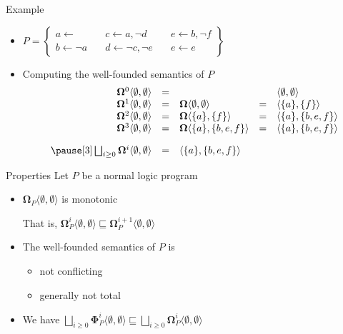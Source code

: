 \begin{frame}{Example}
  \bigskip
  \begin{itemize}
  \item<1->
    \(
    P
    =
    \left\{
      \begin{array}{lll}
        a \leftarrow                \quad &
        c \leftarrow a, \neg d      \quad &
        e \leftarrow b, \neg f
        \\
        b \leftarrow \neg a         \quad &
        d \leftarrow \neg c, \neg e \quad &
        e \leftarrow e
      \end{array}
    \right\}
    \)
  \bigskip
  \item<2-> Computing the well-founded semantics of $P$
    \[
    \begin{array}{rclcl}
      \mathbf{\Omega}^0\langle\emptyset,\emptyset\rangle&=&                                                & &\langle\emptyset,\emptyset\rangle
      \\
      \mathbf{\Omega}^1\langle\emptyset,\emptyset\rangle&=&\mathbf{\Omega}\langle\emptyset,\emptyset\rangle&=&\langle\{a\}    ,\{f\}    \rangle
      \\
      \mathbf{\Omega}^2\langle\emptyset,\emptyset\rangle&=&\mathbf{\Omega}\langle\{a\}    ,\{f\}    \rangle&=&\langle\{a\}    ,\{b,e,f\}\rangle
      \\
      \mathbf{\Omega}^3\langle\emptyset,\emptyset\rangle&=&\mathbf{\Omega}\langle\{a\}    ,\{b,e,f\}\rangle&=&\langle\{a\}    ,\{b,e,f\}\rangle
      \\[10pt]\pause[3]
      \bigsqcup_{i \geq 0}\mathbf{\Omega}^i\langle\emptyset,\emptyset\rangle&=&\langle\{a\},\{b,e,f\}\rangle
    \end{array}
    \]
  \end{itemize}
\end{frame}
\begin{frame}{Properties}
  \bigskip
  Let $P$ be a normal logic program
  \medskip
  \begin{itemize}
  \item ${\mathbf{\Omega}}_P\langle \emptyset, \emptyset \rangle$ is monotonic
    \smallskip

    That is,
    \(
    {\mathbf{\Omega}}_P^i\langle \emptyset, \emptyset \rangle
    \sqsubseteq
    {\mathbf{\Omega}}_P^{i+1}\langle \emptyset, \emptyset \rangle
    \)
    \smallskip
  \item The well-founded semantics of $P$ is
    \begin{itemize}\normalsize
    \item not conflicting
    \item generally not total
    \end{itemize}
    \smallskip
  \item We have
    \(
    \bigsqcup_{i \geq 0}
    {\mathbf{\Phi}}_P^i \langle \emptyset, \emptyset \rangle
    \sqsubseteq
    \bigsqcup_{i \geq 0} {\mathbf{\Omega}}_P^i \langle
    \emptyset, \emptyset \rangle
    \)
  \end{itemize}
\end{frame}
